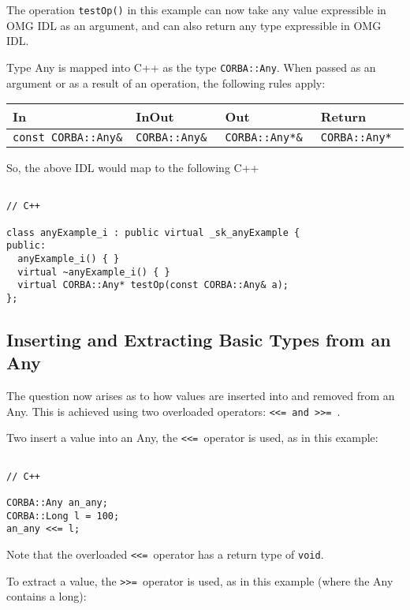 \documentclass[11pt,twoside,onecolumn]{book}
\begin{document}
The operation {\tt testOp()} in this example can now take any value 
expressible in OMG IDL as an argument, and can also return any type 
expressible in OMG IDL.

Type Any is mapped into C++ as the type {\tt CORBA::Any}. When passed as
an argument or as a result of an operation, the following rules apply:

{\small
\begin{tabular}{llll}
{\bf In }                & {\bf InOut }       & {\bf Out }           & 
{\bf Return }                                                   \\ \hline
{\tt const CORBA::Any\& }& {\tt CORBA::Any\& }& {\tt CORBA::Any*\& } & 
{\tt CORBA::Any* }
\end{tabular}
}

\vspace{7mm}
So, the above IDL would map to the following C++

{\small
\begin{verbatim}

// C++

class anyExample_i : public virtual _sk_anyExample {
public:
  anyExample_i() { }
  virtual ~anyExample_i() { }
  virtual CORBA::Any* testOp(const CORBA::Any& a);
};

\end{verbatim}
}
     


\subsection{Inserting and Extracting Basic Types from an Any}

The question now arises as to how values are inserted into and removed from
an Any. This is achieved using two overloaded operators: {\tt <<= and >>= }.

Two insert a value into an Any, the {\tt <<= }operator is used, as in this 
example:

{\small
\begin{verbatim}

// C++
 
CORBA::Any an_any;
CORBA::Long l = 100;
an_any <<= l;

\end{verbatim}
}


Note that the overloaded {\tt <<= }operator has a return type of {\tt void}.

To extract a value, the {\tt >>= }operator is used, as in this example (where
the Any contains a long):
\end{document}
